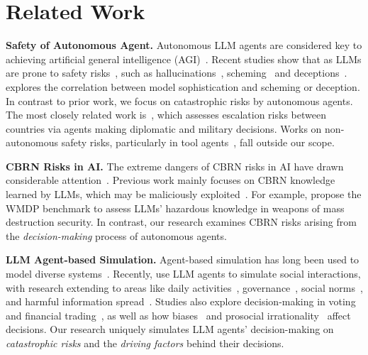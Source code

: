 \section{Related Work}

\noindent\textbf{Safety of Autonomous Agent.}
Autonomous LLM agents are considered key to achieving artificial general intelligence (AGI)~\citep{bengio2023managing, morris2023levels, wang2024survey}. Recent studies show that as LLMs are prone to safety risks~\citep{bengio2025superintelligent}, such as hallucinations~\citep{ji2023survey, rawte2023survey}, scheming~\citep{meinke2024frontier, jaech2024openai, ord2024case, greenblatt2024alignment, balesni2024towards} and deceptions~\citep{scheurer2024large, park2024ai, su2024ai}. \citet{phuong2024evaluating} explores the correlation between model sophistication and scheming or deception. In contrast to prior work, we focus on catastrophic risks by autonomous agents. The most closely related work is~\citet{rivera2024escalation}, which assesses escalation risks between countries via agents making diplomatic and military decisions. Works on non-autonomous safety risks, particularly in tool agents~\citep{zhan2024injecagent, ye2024toolsword, zhang2024agent}, fall outside our scope.

\noindent\textbf{CBRN Risks in AI.}
The extreme dangers of CBRN risks in AI have drawn considerable attention~\citep{lohn2018might, koessler2024risk, christodorescu2024securing,jaech2024openai, anthropic2024rsp, phuong2024evaluating,biden2023executive, dhs2024cbrnai}. Previous work mainly focuses on CBRN knowledge learned by LLMs, which may be maliciously exploited~\citep{urbina2022dual, anwar2024foundational, guest2024operational}. For example, \citet{li2024wmdp} propose the WMDP benchmark to assess LLMs' hazardous knowledge in weapons of mass destruction security. In contrast, our research examines CBRN risks arising from the \emph{decision-making} process of autonomous agents.

\noindent\textbf{LLM Agent-based Simulation.}
Agent-based simulation has long been used to model diverse systems~\citep{epstein1996growing, macal2009agent}. Recently, \citet{park2023generative} use LLM agents to simulate social interactions, with research extending to areas like daily activities~\citep{wang2024simulating}, governance~\citep{piatti2024cooperate}, social norms~\citep{ren2024emergence}, and harmful information spread~\citep{ju2024flooding}. Studies also explore decision-making in voting~\citep{yang2024llm} and financial trading~\citep{yu2024fincon}, as well as how biases~\citep{schmidgall2024agentclinic, bai2024fairmonitor} and prosocial irrationality~\citep{liu2024exploring} affect decisions. Our research uniquely simulates LLM agents' decision-making on \emph{catastrophic risks} and the \emph{driving factors} behind their decisions.
